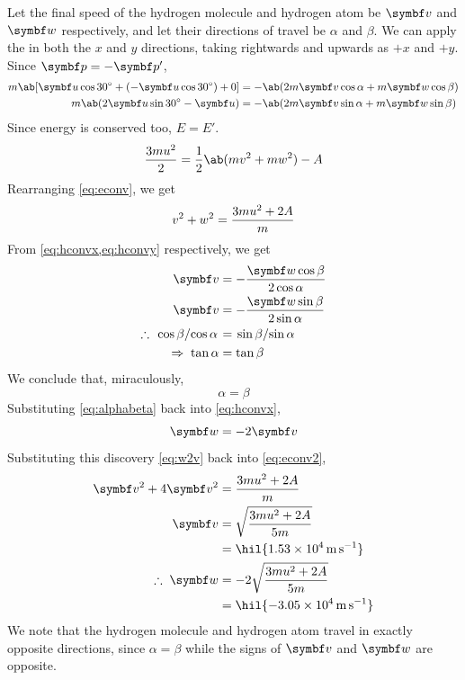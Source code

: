 Let the final speed of the hydrogen molecule and hydrogen atom be
\(\mv{v}\) and \(\mv{w}\) respectively,
and let their directions of travel be \(\alpha\) and \(\beta\).
We can apply the  in both the
\(x\) and \(y\) directions,
taking rightwards and upwards as \(+x\) and \(+y\). Since \(\mv{p} = -\mv{p}'\),
\begin{align}
  \label{eq:hconvx}
  m\ab[\mv{u}\cos\qty{30}{\degree} + (-\mv{u}\cos\qty{30}{\degree}) +
  0] &= -\ab(2m\mv{v}\cos\alpha + m\mv{w}\cos\beta) \\
  \label{eq:hconvy}
  m\ab(2\mv{u}\sin\qty{30}{\degree}-\mv{u}) &=
  -\ab(2m\mv{v}\sin\alpha + m\mv{w}\sin\beta)
\end{align}
Since energy is conserved too, \(E = E'\).
\begin{equation}
  \f{3mu^2}{2} = \f{1}{2}\ab(mv^2 + mw^2) - A
  \label{eq:econv}
\end{equation}
Rearranging \cref{eq:econv}, we get
\begin{equation}
  v^2 + w^2 = \frac{3mu^2 + 2A}{m}
  \label{eq:econv2}
\end{equation}
From \cref{eq:hconvx,eq:hconvy} respectively, we get
\begin{align*}
  \mv{v} &= -\f{\mv{w}\cos\beta}{2\cos\alpha} \\
  \mv{v} &= -\f{\mv{w}\sin\beta}{2\sin\alpha} \\
  \therefore\; \lf{\cos\beta}{\cos\alpha} &= \lf{\sin\beta}{\sin\alpha} \\
  \Rightarrow\; \tan\alpha &= \tan\beta
\end{align*}
We conclude that, miraculously,
\begin{equation}
  \alpha = \beta
  \label{eq:alphabeta}
\end{equation}
Substituting \cref{eq:alphabeta} back into \cref{eq:hconvx},
\begin{equation}
  \mv{w} = -2\mv{v}
  \label{eq:w2v}
\end{equation}
Substituting this  discovery \cref{eq:w2v} back into
\ref{eq:econv2},
\begin{align*}
  \mv{v}^2 + 4\mv{v}^2 &= \f{3mu^2+2A}{m} \\
  \mv{v} &= \sqrt{\f{3mu^2+2A}{5m}} \\
  &= \hil{\qty{1.53e4}{\metre\per\second}}\\
  \therefore\; \mv{w} &= -2\sqrt{\f{3mu^2+2A}{5m}}\\
  &= \hil{\qty{-3.05e4}{\metre\per\second}}
\end{align*}
We note that the hydrogen molecule and hydrogen atom travel in
exactly opposite directions, since \(\alpha=\beta\) while the signs
of \(\mv{v}\) and \(\mv{w}\)
are opposite.

